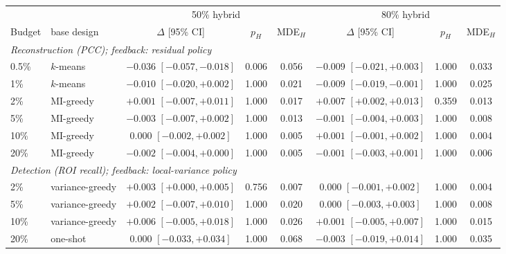 \begin{tabular}{llcccccc}
\toprule
 & & \multicolumn{3}{c}{50\% hybrid} & \multicolumn{3}{c}{80\% hybrid} \\
\cmidrule(lr){3-5}\cmidrule(lr){6-8}
Budget & base design & $\Delta$ [95\% CI] & $p_H$ & MDE$_H$ & $\Delta$ [95\% CI] & $p_H$ & MDE$_H$ \\
\midrule
\multicolumn{8}{l}{\emph{Reconstruction (PCC); feedback: residual policy}} \\
0.5\% & $k$-means & $-0.036$ $[-0.057, -0.018]$ & 0.006 & 0.056 & $-0.009$ $[-0.021, {+}0.003]$ & 1.000 & 0.033 \\
1\% & $k$-means & $-0.010$ $[-0.020, {+}0.002]$ & 1.000 & 0.021 & $-0.009$ $[-0.019, -0.001]$ & 1.000 & 0.025 \\
2\% & MI-greedy & ${+}0.001$ $[-0.007, {+}0.011]$ & 1.000 & 0.017 & ${+}0.007$ $[{+}0.002, {+}0.013]$ & 0.359 & 0.013 \\
5\% & MI-greedy & $-0.003$ $[-0.007, {+}0.002]$ & 1.000 & 0.013 & $-0.001$ $[-0.004, {+}0.003]$ & 1.000 & 0.008 \\
10\% & MI-greedy & $0.000$ $[-0.002, {+}0.002]$ & 1.000 & 0.005 & ${+}0.001$ $[-0.001, {+}0.002]$ & 1.000 & 0.004 \\
20\% & MI-greedy & $-0.002$ $[-0.004, {+}0.000]$ & 1.000 & 0.005 & $-0.001$ $[-0.003, {+}0.001]$ & 1.000 & 0.006 \\
\midrule
\multicolumn{8}{l}{\emph{Detection (ROI recall); feedback: local-variance policy}} \\
2\% & variance-greedy & ${+}0.003$ $[{+}0.000, {+}0.005]$ & 0.756 & 0.007 & $0.000$ $[-0.001, {+}0.002]$ & 1.000 & 0.004 \\
5\% & variance-greedy & ${+}0.002$ $[-0.007, {+}0.010]$ & 1.000 & 0.020 & $0.000$ $[-0.003, {+}0.003]$ & 1.000 & 0.008 \\
10\% & variance-greedy & ${+}0.006$ $[-0.005, {+}0.018]$ & 1.000 & 0.026 & ${+}0.001$ $[-0.005, {+}0.007]$ & 1.000 & 0.015 \\
20\% & one-shot & $0.000$ $[-0.033, {+}0.034]$ & 1.000 & 0.068 & $-0.003$ $[-0.019, {+}0.014]$ & 1.000 & 0.035 \\
\bottomrule
\end{tabular}